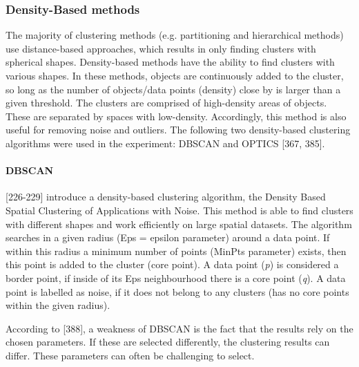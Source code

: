 \subsubsection{Density-Based methods}
\label{section:densityBasedMethods}
The majority of clustering methods (e.g. partitioning and hierarchical methods) use distance-based approaches, which results in only finding clusters with spherical shapes. Density-based methods have the ability to find clusters with various shapes. In these methods, objects are continuously added to the cluster, so long as the number of objects/data points (density) close by is larger than a given threshold. The clusters are comprised of high-density areas of objects. These are separated by spaces with low-density. Accordingly, this method is also useful for removing noise and outliers. The following two density-based clustering algorithms were used in the experiment: DBSCAN and OPTICS \autocite{han2011data}[367, 385].


\paragraph{DBSCAN}
\label{section:DBSCAN}
\textcite{DBSCAN}[226-229] introduce a density-based clustering algorithm, the Density Based Spatial Clustering of Applications with Noise. This method is able to find clusters with different shapes and work efficiently on large spatial datasets. The algorithm searches in a given radius (Eps = epsilon parameter) around a data point. If within this radius a minimum number of points (MinPts parameter) exists, then this point is added to the cluster (core point). A data point (\textit{p}) is considered a border point, if inside of its Eps neighbourhood there is a core point (\textit{q}). A data point is labelled as noise, if it does not belong to any clusters (has no core points within the given radius). 

According to \textcite{han2011data}[388], a weakness of DBSCAN is the fact that the results rely on the chosen parameters. If these are selected differently, the clustering results can differ. These parameters can often be challenging to select.


